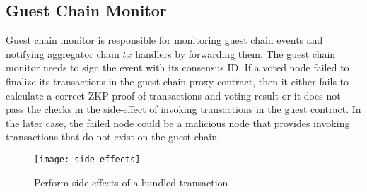 \subsection{Guest Chain Monitor}
Guest chain monitor is responsible for monitoring guest chain events and notifying aggregator chain $tx$ handlers by forwarding them. The guest chain monitor needs to sign the event with its consensus ID. If a voted \dprotocol node failed to finalize its transactions in the guest chain proxy contract, then it either fails to calculate a correct ZKP proof of transactions and voting result or it does not pass the checks in the side-effect of invoking transactions in the guest contract. In the later case, the failed node could be a malicious node that provides invoking transactions that do not exist on the guest chain.  
\begin{figure}[!ht]
\begin{center}
\texttt{[image: side-effects]}
\caption{Perform side effects of a bundled transaction}
\label{sideffects}
\end{center}
\end{figure}
